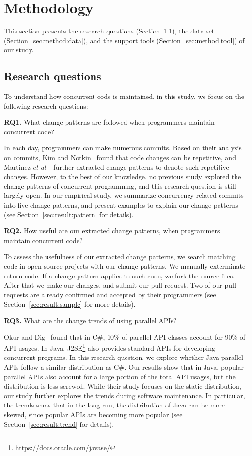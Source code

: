 \section{Methodology}
\label{sec:method}
This section presents the research questions (Section~\ref{sec:method:rq}), the data set (Section~\ref{sec:method:data}), and the support tools (Section~\ref{sec:method:tool}) of our study.
\subsection{Research questions}
\label{sec:method:rq}
To understand how concurrent code is maintained, in this study, we focus on the following research questions:

\textbf{RQ1.} What change patterns are followed when programmers maintain concurrent code?

In each day, programmers can make numerous commits. Based on their analysis on commits, Kim and Notkin~\cite{conf/icse/KimN09} found that code changes can be repetitive, and Martinez \emph{et al.}~\cite{conf/icsm/MartinezDM13} further extracted change patterns to denote such repetitive changes. However, to the best of our knowledge, no previous study explored the change patterns of concurrent programming, and this research question is still largely open. In our empirical study, we summarize concurrency-related commits into five change patterns, and present examples to explain our change patterns (see Section~\ref{sec:result:pattern} for details).

\textbf{RQ2.} How useful are our extracted change patterns, when programmers maintain concurrent code?

To assess the usefulness of our extracted change patterns, we search matching code in open-source projects with our change patterns. We manually exterminate return code. If a change pattern applies to such code, we fork the source files. After that we make our changes, and submit our pull request. Two of our pull requests are already confirmed and accepted by their programmers (see Section~\ref{sec:result:sample} for more details).

\textbf{RQ3.} What are the change trends of using parallel APIs?

Okur and Dig~\cite{conf/sigsoft/OkurD12} found that in C\#, 10\% of parallel API classes account for 90\% of API usages. In Java, J2SE\footnote{\url{https://docs.oracle.com/javase/}} also provides standard APIs for developing concurrent programs. In this research question, we explore whether Java parallel APIs follow a similar distribution as C\#. Our results show that in Java, popular parallel APIs also account for a large portion of the total API usages, but the distribution is less screwed. While their study focuses on the static distribution, our study further explores the trends during software maintenance. In particular, the trends show that in the long run, the distribution of Java can be more skewed, since popular APIs are becoming more popular (see Section~\ref{sec:result:trend} for details).

